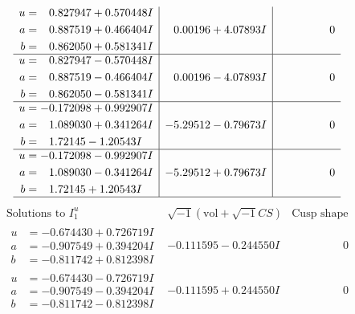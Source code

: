 \documentclass[1p]{elsarticle_modified}
\theoremstyle{definition}
\newcommand{\I}{\sqrt{-1}}
\begin{document}
$$\begin{array}{c|c|c}
\begin{aligned}
u &= \phantom{-}0.827947 + 0.570448 I \\
a &= \phantom{-}0.887519 + 0.466404 I \\
b &= \phantom{-}0.862050 + 0.581341 I\end{aligned}
 & \phantom{-}0.00196 + 4.07893 I & \phantom{-0.000000 } 0 \\ \hline\begin{aligned}
u &= \phantom{-}0.827947 - 0.570448 I \\
a &= \phantom{-}0.887519 - 0.466404 I \\
b &= \phantom{-}0.862050 - 0.581341 I\end{aligned}
 & \phantom{-}0.00196 - 4.07893 I & \phantom{-0.000000 } 0 \\ \hline\begin{aligned}
u &= -0.172098 + 0.992907 I \\
a &= \phantom{-}1.089030 + 0.341264 I \\
b &= \phantom{-}1.72145 - 1.20543 I\end{aligned}
 & -5.29512 - 0.79673 I & \phantom{-0.000000 } 0 \\ \hline\begin{aligned}
u &= -0.172098 - 0.992907 I \\
a &= \phantom{-}1.089030 - 0.341264 I \\
b &= \phantom{-}1.72145 + 1.20543 I\end{aligned}
 & -5.29512 + 0.79673 I & \phantom{-0.000000 } 0\\
 \hline 
 \end{array}$$\newpage$$\begin{array}{c|c|c}  
\text{Solutions to }I^u_{1}& \I (\text{vol} + \sqrt{-1}CS) & \text{Cusp shape}\\
 \hline 
\begin{aligned}
u &= -0.674430 + 0.726719 I \\
a &= -0.907549 + 0.394204 I \\
b &= -0.811742 + 0.812398 I\end{aligned}
 & -0.111595 - 0.244550 I & \phantom{-0.000000 } 0 \\ \hline\begin{aligned}
u &= -0.674430 - 0.726719 I \\
a &= -0.907549 - 0.394204 I \\
b &= -0.811742 - 0.812398 I\end{aligned}
 & -0.111595 + 0.244550 I & \phantom{-0.000000 } 0 \\ \hline\begin{aligned}

\end{aligned}
\end{array}$$
\end{document}
